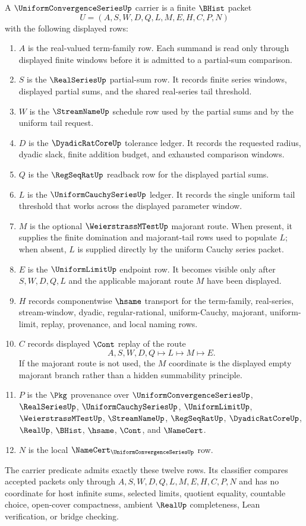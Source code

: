 \begin{definition}
\label{def:uniform-convergence-series-carrier}
A $\UniformConvergenceSeriesUp$ carrier is a finite $\BHist$ packet
$$
U=(A,S,W,D,Q,L,M,E,H,C,P,N)
$$
with the following displayed rows:
\begin{enumerate}
\item $A$ is the real-valued term-family row. Each summand is read only through displayed finite windows before it is admitted to a partial-sum comparison.
\item $S$ is the $\RealSeriesUp$ partial-sum row. It records finite series windows, displayed partial sums, and the shared real-series tail threshold.
\item $W$ is the $\StreamNameUp$ schedule row used by the partial sums and by the uniform tail request.
\item $D$ is the $\DyadicRatCoreUp$ tolerance ledger. It records the requested radius, dyadic slack, finite addition budget, and exhausted comparison windows.
\item $Q$ is the $\RegSeqRatUp$ readback row for the displayed partial sums.
\item $L$ is the $\UniformCauchySeriesUp$ ledger. It records the single uniform tail threshold that works across the displayed parameter window.
\item $M$ is the optional $\WeierstrassMTestUp$ majorant route. When present, it supplies the finite domination and majorant-tail rows used to populate $L$; when absent, $L$ is supplied directly by the uniform Cauchy series packet.
\item $E$ is the $\UniformLimitUp$ endpoint row. It becomes visible only after $S,W,D,Q,L$ and the applicable majorant route $M$ have been displayed.
\item $H$ records componentwise $\hsame$ transport for the term-family, real-series, stream-window, dyadic, regular-rational, uniform-Cauchy, majorant, uniform-limit, replay, provenance, and local naming rows.
\item $C$ records displayed $\Cont$ replay of the route
$$
A,S,W,D,Q \longmapsto L \longmapsto M \longmapsto E .
$$
If the majorant route is not used, the $M$ coordinate is the displayed empty majorant branch rather than a hidden summability principle.
\item $P$ is the $\Pkg$ provenance over $\UniformConvergenceSeriesUp$, $\RealSeriesUp$, $\UniformCauchySeriesUp$, $\UniformLimitUp$, $\WeierstrassMTestUp$, $\StreamNameUp$, $\RegSeqRatUp$, $\DyadicRatCoreUp$, $\RealUp$, $\BHist$, $\hsame$, $\Cont$, and $\NameCert$.
\item $N$ is the local $\NameCert_{\UniformConvergenceSeriesUp}$ row.
\end{enumerate}
The carrier predicate admits exactly these twelve rows. Its classifier compares accepted packets only through $A,S,W,D,Q,L,M,E,H,C,P,N$ and has no coordinate for host infinite sums, selected limits, quotient equality, countable choice, open-cover compactness, ambient $\RealUp$ completeness, Lean verification, or bridge checking.
\end{definition}

